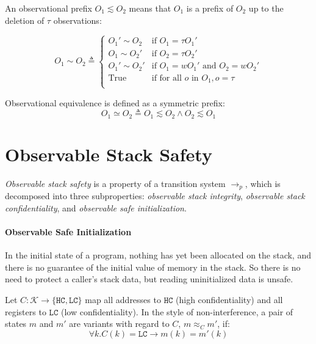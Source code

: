 \documentclass{article}
\begin{document}
    An observational prefix \(O_1 \lesssim O_2\) means that \(O_1\) is a prefix of \(O_2\) up to the deletion
    of \(\tau\) observations:

    \[O_1 \sim O_2 \triangleq
      \begin{cases}
        O_1' \sim O_2 & \text{if } O_1 = \tau O_1' \\
        O_1 \sim O_2' & \text{if } O_2 = \tau O_2' \\
        O_1' \sim O_2' & \text{if } O_1 = w O_1' \text{ and } O_2 = w O_2' \\
        \text{True} & \text{if for all } o \text{ in } O_1, o = \tau \\
      \end{cases}\]

    Observational equivalence is defined as a symmetric prefix:
    \[O_1 \simeq O_2 \triangleq O_1 \lesssim O_2 \land O_2 \lesssim O_1\]
 
  \section{Observable Stack Safety}

    {\it Observable stack safety} is a property of a transition system \(\longrightarrow_p\),
    which is decomposed into three subproperties:
    {\it observable stack integrity}, {\it observable stack confidentiality}, and
    {\it observable safe initialization}. 


    \paragraph{Observable Safe Initialization}

      In the initial state of a program, nothing has yet been allocated on the stack, and
      there is no guarantee of the initial value of memory in the stack. So there is no
      need to protect a caller's stack data, but reading uninitialized data is unsafe.

      Let \(C : \mathcal{K} \rightarrow \{\mathtt{HC},\mathtt{LC}\}\) map all addresses
      to \(\mathtt{HC}\) (high confidentiality) and all registers to \(\mathtt{LC}\)
      (low confidentiality). In the style of non-interference, a pair of states \(m\)
      and \(m'\) are variants with regard to \(C\), \(m \approx_C m'\), if:
      \[\forall k . C(k) = \mathtt{LC} \rightarrow m(k) = m'(k)\]
      
\end{document}
